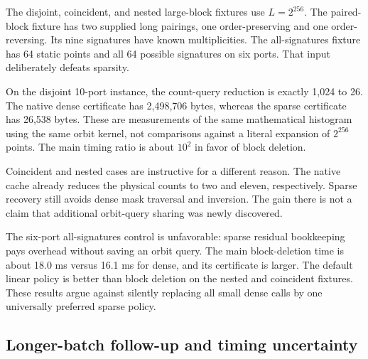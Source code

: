 \documentclass[11pt,letterpaper]{article}
\theoremstyle{definition}\newtheorem{definition}[theorem]{Definition}
\theoremstyle{remark}\newtheorem{remark}[theorem]{Remark}
\begin{document}
The disjoint, coincident, and nested large-block fixtures use $L=2^{256}$. The paired-block fixture has two supplied long pairings, one order-preserving and one order-reversing. Its nine signatures have known multiplicities. The all-signatures fixture has 64 static points and all 64 possible signatures on six ports. That input deliberately defeats sparsity.

\begin{table}[H]
\centering\small

\caption{Main median wall times in milliseconds. Dense, linear, and split are uncertified queries. The last column includes sparse certificate production and independent replay; it is not a like-for-like timing of two certification backends.}
\label{tab:timings}
\end{table}

\begin{table}[H]
\centering\small

\caption{Physical orbit-count calls and compact-JSON certificate sizes. Both dense and sparse certificates were independently verified. Certificate serialization was not timed.}
\label{tab:queries}
\end{table}

On the disjoint 10-port instance, the count-query reduction is exactly 1,024 to 26. The native dense certificate has 2,498,706 bytes, whereas the sparse certificate has 26,538 bytes. These are measurements of the same mathematical histogram using the same orbit kernel, not comparisons against a literal expansion of $2^{256}$ points. The main timing ratio is about $10^2$ in favor of block deletion.

Coincident and nested cases are instructive for a different reason. The native cache already reduces the physical counts to two and eleven, respectively. Sparse recovery still avoids dense mask traversal and inversion. The gain there is not a claim that additional orbit-query sharing was newly discovered.

The six-port all-signatures control is unfavorable: sparse residual bookkeeping pays overhead without saving an orbit query. The main block-deletion time is about 18.0 ms versus 16.1 ms for dense, and its certificate is larger. The default linear policy is better than block deletion on the nested and coincident fixtures. These results argue against silently replacing all small dense calls by one universally preferred sparse policy.

\subsection{Longer-batch follow-up and timing uncertainty}
\end{document}
